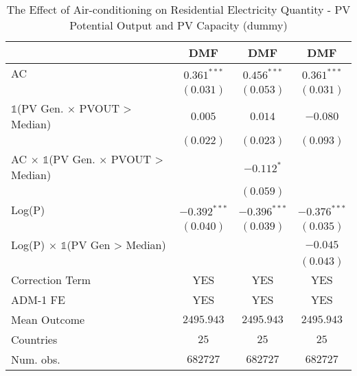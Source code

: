 
\begin{table}[htbp]
\caption{The Effect of Air-conditioning on Residential Electricity Quantity - PV Potential Output and PV Capacity (dummy)}
\begin{center}
\begin{tabular}{l c c c}
\hline
 & DMF & DMF & DMF \\
\hline
AC                                                        & $0.361^{***}$  & $0.456^{***}$  & $0.361^{***}$  \\
                                                          & $(0.031)$      & $(0.053)$      & $(0.031)$      \\
$\mathds{1}$(PV Gen. $\times$ PVOUT > Median)             & $0.005$        & $0.014$        & $-0.080$       \\
                                                          & $(0.022)$      & $(0.023)$      & $(0.093)$      \\
AC $\times$ $\mathds{1}$(PV Gen. $\times$ PVOUT > Median) &                & $-0.112^{*}$   &                \\
                                                          &                & $(0.059)$      &                \\
Log(P)                                                    & $-0.392^{***}$ & $-0.396^{***}$ & $-0.376^{***}$ \\
                                                          & $(0.040)$      & $(0.039)$      & $(0.035)$      \\
Log(P) $\times$ $\mathds{1}$(PV Gen > Median)             &                &                & $-0.045$       \\
                                                          &                &                & $(0.043)$      \\
\hline
Correction Term                                           & YES            & YES            & YES            \\
ADM-1 FE                                                  & YES            & YES            & YES            \\
Mean Outcome                                              & $2495.943$     & $2495.943$     & $2495.943$     \\
Countries                                                 & $25$           & $25$           & $25$           \\
Num. obs.                                                 & $682727$       & $682727$       & $682727$       \\

\end{tabular}
\end{center}
\end{table}
